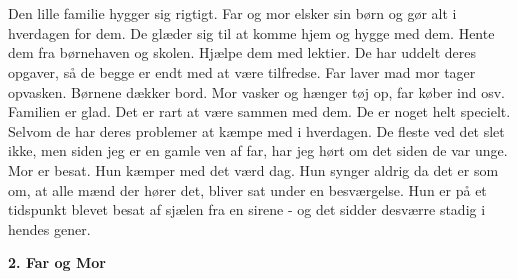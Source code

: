 \documentclass[]{article}
\begin{document}
\\ \\
Den lille familie hygger sig rigtigt. Far og mor elsker sin børn og gør alt i hverdagen for dem. De glæder sig til at komme hjem og hygge med dem. Hente dem fra børnehaven og skolen. Hjælpe dem med lektier. De har uddelt deres opgaver, så de begge er endt med at være tilfredse. Far laver mad mor tager opvasken. Børnene dækker bord. Mor vasker og hænger tøj op, far køber ind osv. Familien er glad. Det er rart at være sammen med dem. De er noget helt specielt. Selvom de har deres problemer at kæmpe med i hverdagen. De fleste ved det slet ikke, men siden jeg er en gamle ven af far, har jeg hørt om det siden de var unge. Mor er besat. Hun kæmper med det værd dag. Hun synger aldrig da det er som om, at alle mænd der hører det, bliver sat under en besværgelse. Hun er på et tidspunkt blevet besat af sjælen fra en sirene - og det sidder desværre stadig i hendes gener.

\begin{center}
	\large\textbf{2. Far og Mor}
\end{center}
\end{document}
